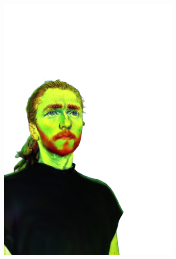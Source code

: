 \begin{figure}[ht]
\begin{subfigure}{0.08\linewidth}
        \includegraphics[width=\textwidth]{Figures/results/high/irene_vangogh/11_render.png}

\end{subfigure}
\end{figure}
